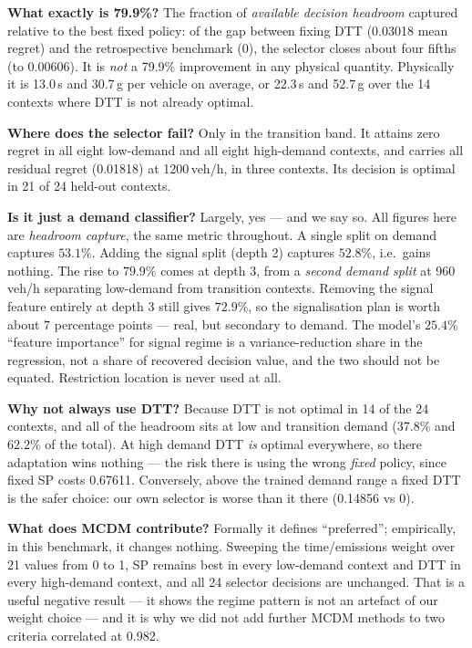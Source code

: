 \documentclass[10pt,a4paper]{article}
\begin{document}
\textbf{What exactly is 79.9\%?} The fraction of \emph{available decision headroom} captured relative to the best fixed policy: of the gap between fixing DTT (0.03018 mean regret) and the retrospective benchmark (0), the selector closes about four fifths (to 0.00606). It is \emph{not} a 79.9\% improvement in any physical quantity. Physically it is 13.0\,s and 30.7\,g per vehicle on average, or 22.3\,s and 52.7\,g over the 14 contexts where DTT is not already optimal.

\textbf{Where does the selector fail?} Only in the transition band. It attains zero regret in all eight low-demand and all eight high-demand contexts, and carries all residual regret (0.01818) at 1200\,veh/h, in three contexts. Its decision is optimal in 21 of 24 held-out contexts.

\textbf{Is it just a demand classifier?} Largely, yes --- and we say so. All figures here are \emph{headroom capture}, the same metric throughout. A single split on demand captures $53.1\%$. Adding the signal split (depth 2) captures $52.8\%$, i.e.\ gains nothing. The rise to $79.9\%$ comes at depth 3, from a \emph{second demand split} at 960\,veh/h separating low-demand from transition contexts. Removing the signal feature entirely at depth 3 still gives $72.9\%$, so the signalisation plan is worth about $7$ percentage points --- real, but secondary to demand. The model's $25.4\%$ ``feature importance'' for signal regime is a variance-reduction share in the regression, not a share of recovered decision value, and the two should not be equated. Restriction location is never used at all.

\textbf{Why not always use DTT?} Because DTT is not optimal in 14 of the 24 contexts, and all of the headroom sits at low and transition demand ($37.8\%$ and $62.2\%$ of the total). At high demand DTT \emph{is} optimal everywhere, so there adaptation wins nothing --- the risk there is using the wrong \emph{fixed} policy, since fixed SP costs 0.67611. Conversely, above the trained demand range a fixed DTT is the safer choice: our own selector is worse than it there (0.14856 vs 0).

\textbf{What does MCDM contribute?} Formally it defines ``preferred''; empirically, in this benchmark, it changes nothing. Sweeping the time/emissions weight over 21 values from 0 to 1, SP remains best in every low-demand context and DTT in every high-demand context, and all 24 selector decisions are unchanged. That is a useful negative result --- it shows the regime pattern is not an artefact of our weight choice --- and it is why we did not add further MCDM methods to two criteria correlated at 0.982.
\end{document}
